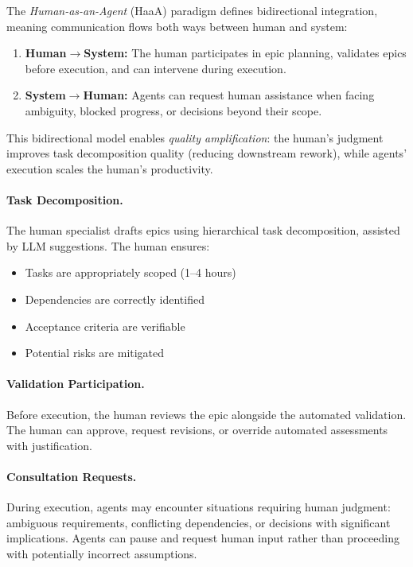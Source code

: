 \begin{definition}
\label{def:haaa}
The \textit{Human-as-an-Agent} (HaaA) paradigm defines bidirectional integration,
meaning communication flows both ways between human and system:
\begin{enumerate}
    \item \textbf{Human$\rightarrow$System:} The human participates in epic
    planning, validates epics before execution, and can intervene during execution.
    \item \textbf{System$\rightarrow$Human:} Agents can request human assistance
    when facing ambiguity, blocked progress, or decisions beyond their scope.
\end{enumerate}
\end{definition}

This bidirectional model enables \textit{quality amplification}: the human's
judgment improves task decomposition quality (reducing downstream rework),
while agents' execution scales the human's productivity.

\paragraph{Task Decomposition.}
The human specialist drafts epics using hierarchical task decomposition,
assisted by LLM suggestions. The human ensures:
\begin{itemize}
    \item Tasks are appropriately scoped (1--4 hours)
    \item Dependencies are correctly identified
    \item Acceptance criteria are verifiable
    \item Potential risks are mitigated
\end{itemize}

\paragraph{Validation Participation.}
Before execution, the human reviews the epic alongside the automated
validation. The human can approve, request revisions, or override
automated assessments with justification.

\paragraph{Consultation Requests.}
During execution, agents may encounter situations requiring human judgment:
ambiguous requirements, conflicting dependencies, or decisions with
significant implications. Agents can pause and request human input rather
than proceeding with potentially incorrect assumptions.

